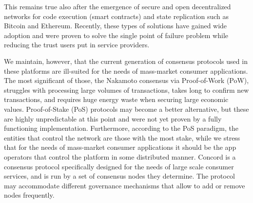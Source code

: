 This remains true also after the emergence of secure and open decentralized networks for code execution (smart contracts) and state replication such as Bitcoin and Ethereum. Recently, these types of solutions have gained wide adoption and were proven to solve the single point of failure problem while reducing the trust users put in service providers. 

We maintain, however, that the current generation of consensus protocols used in these platforms are ill-suited for the needs of mass-market consumer applications. The most significant of those, the Nakamoto consensus via Proof-of-Work (PoW), struggles with processing large volumes of transactions, takes long to confirm new transactions, and requires huge energy waste when securing large economic values. Proof-of-Stake (PoS) protocols may become a better alternative, but these are highly unpredictable at this point and were not yet proven by a fully functioning implementation. Furthermore, according to the PoS paradigm, the entities that control the network are those with the most stake, while we stress that for the needs of mass-market consumer applications it should be the app operators that control the platform in some distributed manner. Concord is a consensus protocol specifically designed for the needs of large scale consumer services, and is run by a set of consensus nodes they determine. 
The protocol may accommodate different governance mechanisms that allow to add or remove nodes frequently.




